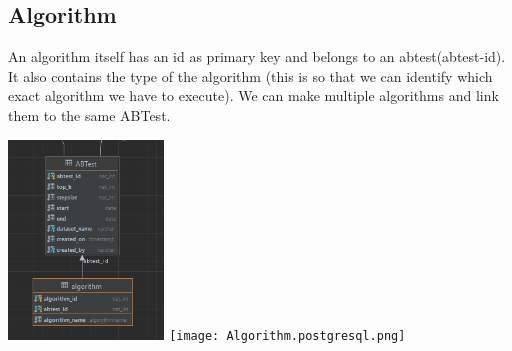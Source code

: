 \documentclass[a4paper,12pt]{article}
\begin{document}
	\subsection{Algorithm} An algorithm itself has an id as primary key and belongs to an abtest(abtest-id). It also contains the type of the algorithm (this is so that we can identify which exact algorithm we have to execute). We can make multiple algorithms and link them to the same ABTest.
\begin{center}

		\includegraphics[height={200px},width=\textwidth,keepaspectratio]{Algorithm.png}
		\texttt{[image: Algorithm.postgresql.png]}
	
\end{center}			
\end{document}
